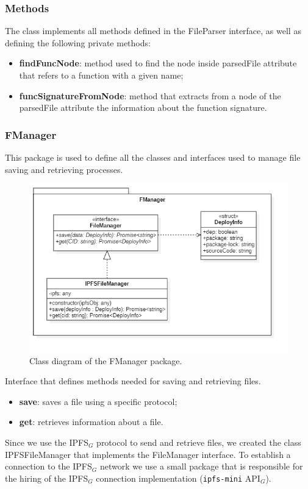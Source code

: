 				\subsubsection*{Methods}
				The class implements all methods defined in the FileParser interface, as well as defining the following private methods:
				\begin{itemize}
					\item \textbf{findFuncNode}: method used to find the node inside parsedFile attribute that refers to a function with a given name;
					\item \textbf{funcSignatureFromNode}: method that extracts from a node of the parsedFile attribute the information about the function signature.
				\end{itemize}

		\subsubsection{FManager}
		This package is used to define all the classes and interfaces used to manage file saving and retrieving processes.
		\begin{figure} [h!]
			\centering
			\includegraphics[width=0.5\linewidth]{diagrammi/etherless-cli/FManager}
			\caption{Class diagram of the FManager package.}
		\end{figure}

			Interface that defines methods needed for saving and retrieving files.

					\begin{itemize}
						\item \textbf{save}: saves a file using a specific protocol;
						\item \textbf{get}: retrieves information about a file.
				\end{itemize}

				Since we use the IPFS$_{G}$ protocol to send and retrieve files, we created the class IPFSFileManager that implements the FileManager interface. To establish a connection to the IPFS$_{G}$ network we use a small package that is responsible for the hiring of the IPFS$_{G}$ connection implementation (\texttt{ipfs-mini} API$_{G}$).

